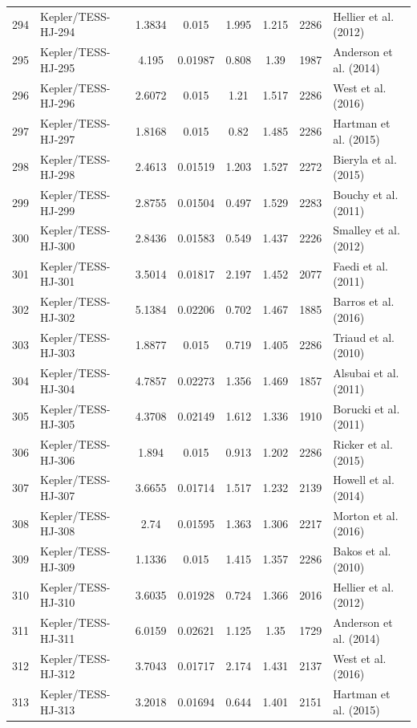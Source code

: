 \begin{longtable}{r l c c c c c p{4.2cm}}
294 & Kepler/TESS-HJ-294 & 1.3834 & 0.015 & 1.995 & 1.215 & 2286 & Hellier et al. (2012) \\
295 & Kepler/TESS-HJ-295 & 4.195 & 0.01987 & 0.808 & 1.39 & 1987 & Anderson et al. (2014) \\
296 & Kepler/TESS-HJ-296 & 2.6072 & 0.015 & 1.21 & 1.517 & 2286 & West et al. (2016) \\
297 & Kepler/TESS-HJ-297 & 1.8168 & 0.015 & 0.82 & 1.485 & 2286 & Hartman et al. (2015) \\
298 & Kepler/TESS-HJ-298 & 2.4613 & 0.01519 & 1.203 & 1.527 & 2272 & Bieryla et al. (2015) \\
299 & Kepler/TESS-HJ-299 & 2.8755 & 0.01504 & 0.497 & 1.529 & 2283 & Bouchy et al. (2011) \\
300 & Kepler/TESS-HJ-300 & 2.8436 & 0.01583 & 0.549 & 1.437 & 2226 & Smalley et al. (2012) \\
301 & Kepler/TESS-HJ-301 & 3.5014 & 0.01817 & 2.197 & 1.452 & 2077 & Faedi et al. (2011) \\
302 & Kepler/TESS-HJ-302 & 5.1384 & 0.02206 & 0.702 & 1.467 & 1885 & Barros et al. (2016) \\
303 & Kepler/TESS-HJ-303 & 1.8877 & 0.015 & 0.719 & 1.405 & 2286 & Triaud et al. (2010) \\
304 & Kepler/TESS-HJ-304 & 4.7857 & 0.02273 & 1.356 & 1.469 & 1857 & Alsubai et al. (2011) \\
305 & Kepler/TESS-HJ-305 & 4.3708 & 0.02149 & 1.612 & 1.336 & 1910 & Borucki et al. (2011) \\
306 & Kepler/TESS-HJ-306 & 1.894 & 0.015 & 0.913 & 1.202 & 2286 & Ricker et al. (2015) \\
307 & Kepler/TESS-HJ-307 & 3.6655 & 0.01714 & 1.517 & 1.232 & 2139 & Howell et al. (2014) \\
308 & Kepler/TESS-HJ-308 & 2.74 & 0.01595 & 1.363 & 1.306 & 2217 & Morton et al. (2016) \\
309 & Kepler/TESS-HJ-309 & 1.1336 & 0.015 & 1.415 & 1.357 & 2286 & Bakos et al. (2010) \\
310 & Kepler/TESS-HJ-310 & 3.6035 & 0.01928 & 0.724 & 1.366 & 2016 & Hellier et al. (2012) \\
311 & Kepler/TESS-HJ-311 & 6.0159 & 0.02621 & 1.125 & 1.35 & 1729 & Anderson et al. (2014) \\
312 & Kepler/TESS-HJ-312 & 3.7043 & 0.01717 & 2.174 & 1.431 & 2137 & West et al. (2016) \\
313 & Kepler/TESS-HJ-313 & 3.2018 & 0.01694 & 0.644 & 1.401 & 2151 & Hartman et al. (2015) \\

\end{longtable}
